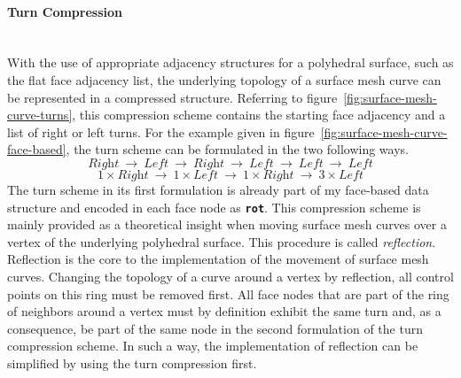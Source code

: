 \documentclass{stdlocal}
\begin{document}
  \paragraph{Turn Compression}\hfill\\
  With the use of appropriate adjacency structures for a polyhedral surface, such as the flat face adjacency list, the underlying topology of a surface mesh curve can be represented in a compressed structure.
  Referring to figure~\ref{fig:surface-mesh-curve-turns}, this compression scheme contains the starting face adjacency and a list of right or left turns.
  For the example given in figure~\ref{fig:surface-mesh-curve-face-based}, the turn scheme can be formulated in the two following ways.
  \[
    \textit{Right}
    \ \longrightarrow\
    \textit{Left}
    \ \longrightarrow\
    \textit{Right}
    \ \longrightarrow\
    \textit{Left}
    \ \longrightarrow\
    \textit{Left}
    \ \longrightarrow\
    \textit{Left}
  \]
  \[
    1\times\textit{Right}
    \ \longrightarrow\
    1\times\textit{Left}
    \ \longrightarrow\
    1\times\textit{Right}
    \ \longrightarrow\
    3\times\textit{Left}
  \]
  The turn scheme in its first formulation is already part of my face-based data structure and encoded in each face node as \textbf{\texttt{rot}}.
  This compression scheme is mainly provided as a theoretical insight when moving surface mesh curves over a vertex of the underlying polyhedral surface.
  This procedure is called \textit{reflection}.
  Reflection is the core to the implementation of the movement of surface mesh curves.
  Changing the topology of a curve around a vertex by reflection, all control points on this ring must be removed first.
  All face nodes that are part of the ring of neighbors around a vertex must by definition exhibit the same turn and, as a consequence, be part of the same node in the second formulation of the turn compression scheme.
  In such a way, the implementation of reflection can be simplified by using the turn compression first.


\end{document}
